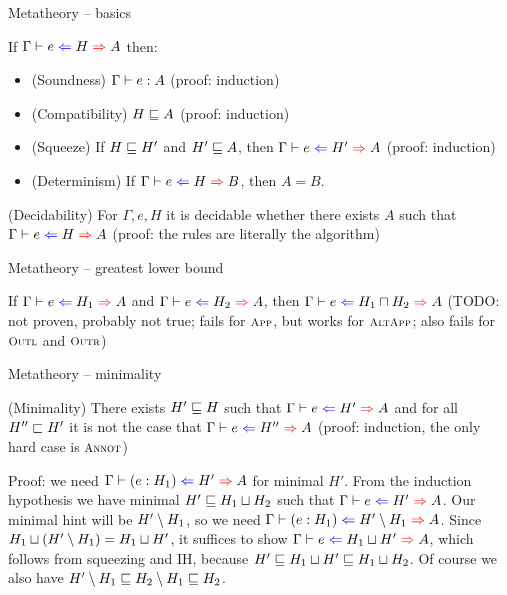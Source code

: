 \documentclass{beamer}
\begin{document}
\begin{frame}{Metatheory -- basics}

If $\fullhinting{\Gamma}{e}{H}{A}$ then:

\begin{itemize}
  \item (Soundness) $\Gamma \vdash e : A$ (proof: induction)
  \item (Compatibility) $H \sqsubseteq A$ (proof: induction)
  \item (Squeeze) If $H \sqsubseteq H'$ and $H' \sqsubseteq A$, then $\fullhinting{\Gamma}{e}{H'}{A}$ (proof: induction)
  \item (Determinism) If $\hinting{e}{H}{B}$, then $A = B$.
\end{itemize}

\vspace{2em}

(Decidability) For $\Gamma, e, H$ it is decidable whether there exists $A$ such that $\fullhinting{\Gamma}{e}{H}{A}$ (proof: the rules are literally the algorithm)

\end{frame}


\begin{frame}{Metatheory -- greatest lower bound}

If $\hinting{e}{H_1}{A}$ and $\hinting{e}{H_2}{A}$, then $\hinting{e}{\hintglb{H_1}{H_2}}{A}$ (TODO: not proven, probably not true; fails for $\textsc{\footnotesize{App}}$, but works for $\textsc{\footnotesize{AltApp}}$; also fails for $\textsc{\footnotesize{Outl}}$ and $\textsc{\footnotesize{Outr}}$)

\end{frame}

\begin{frame}{Metatheory -- minimality}

(Minimality) There exists $H' \sqsubseteq H$ such that $\fullhinting{\Gamma}{e}{H'}{A}$ and for all $H'' \sqsubset H'$ it is not the case that $\fullhinting{\Gamma}{e}{H''}{A}$ (proof: induction, the only hard case is $\textsc{\footnotesize{Annot}}$)

\vspace{1em}

Proof: we need $\hinting{\annot{e}{H_1}}{H'}{A}$ for minimal $H'$. From the induction hypothesis we have minimal $H' \sqsubseteq H_1 \sqcup H_2$ such that $\hinting{e}{H'}{A}$. Our minimal hint will be $H' \setminus H_1$, so we need $\hinting{\annot{e}{H_1}}{\hintdiff{H'}{H_1}}{A}$. Since $H_1 \sqcup (H' \setminus H_1) = H_1 \sqcup H'$, it suffices to show $\hinting{e}{\hintlub{H_1}{H'}}{A}$, which follows from squeezing and IH, because $H' \sqsubseteq H_1 \sqcup H' \sqsubseteq H_1 \sqcup H_2$. Of course we also have $H' \setminus H_1 \sqsubseteq H_2 \setminus H_1 \sqsubseteq H_2$.

\end{frame}
\end{document}
